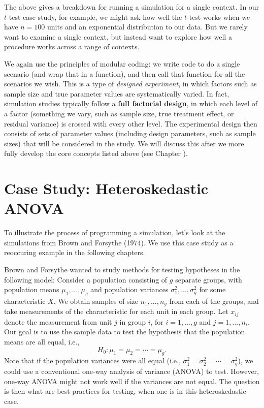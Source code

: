 \documentclass[
]{book}
\begin{document}
The above gives a breakdown for running a simulation for a single context.
In our \(t\)-test case study, for example, we might ask how well the \(t\)-test works when we have \(n=100\) units and an exponential distribution to our data.
But we rarely want to examine a single context, but instead want to explore how well a procedure works across a range of contexts.

We again use the principles of modular coding: we write code to do a single scenario (and wrap that in a function), and then call that function for all the scenarios we wish.
This is a type of \emph{designed experiment}, in which factors such as sample size and true parameter values are systematically varied.
In fact, simulation studies typically follow a \textbf{full factorial design}, in which each level of a factor (something we vary, such as sample size, true treatment effect, or residual variance) is crossed with every other level.
The experimental design then consists of sets of parameter values (including design parameters, such as sample sizes) that will be considered in the study.
We will discuss this after we more fully develop the core concepts listed above (see Chapter \citet{exp_design}).

\hypertarget{case_ANOVA}{%
\chapter{Case Study: Heteroskedastic ANOVA}\label{case_ANOVA}}

To illustrate the process of programming a simulation, let's look at the simulations from Brown and Forsythe (1974).
We use this case study as a reoccuring example in the following chapters.

Brown and Forsythe wanted to study methods for testing hypotheses in the following model: Consider a population consisting of \(g\) separate groups, with population means \(\mu_1,...,\mu_g\) and population variances \(\sigma_1^2,...,\sigma_g^2\) for some characteristic \(X\). We obtain samples of size \(n_1,...,n_g\) from each of the groups, and take measurements of the characteristic for each unit in each group. Let \(x_{ij}\) denote the measurement from unit \(j\) in group \(i\), for \(i = 1,...,g\) and \(j = 1,...,n_i\). Our goal is to use the sample data to test the hypothesis that the population means are all equal, i.e.,
\[
H_0: \mu_1 = \mu_2 = \cdots = \mu_g.
\]
Note that if the population variances were all equal (i.e., \(\sigma_1^2 = \sigma_2^2 = \cdots = \sigma_g^2\)), we could use a conventional one-way analysis of variance (ANOVA) to test.
However, one-way ANOVA might not work well if the variances are not equal.
The question is then what are best practices for testing, when one is in this heteroskedastic case.
\end{document}
